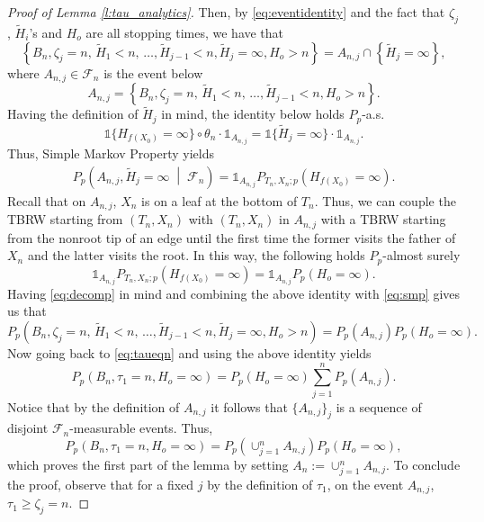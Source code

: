 \documentclass[a4paper]{amsart}
\newcommand{\hitfetak}{\widetilde{H}}
\newcommand{\Lbrace}{\left\lbrace}
\newcommand{\Rbrace}{\right\rbrace}
\begin{document}
\begin{proof}[Proof of Lemma \ref{l:tau_analytics}]
Then, by \eqref{eq:eventidentity} and the fact that $\zeta_j$, $\hitfetak_i$'s and $H_o$ are all stopping times, we have that
\begin{equation}\label{eq:decomp}
    \Lbrace B_n, \zeta_j = n,\, \hitfetak_1 < n,\, \dots, \hitfetak_{j-1} < n, \hitfetak_j = \infty, H_o >n\Rbrace = A_{n,j}\cap \Lbrace \hitfetak_j = \infty \Rbrace,
\end{equation}
where $A_{n,j} \in \mathcal{F}_n$ is the event below
\begin{equation}\label{eq:Anj}
A_{n,j} = \Lbrace B_n,\zeta_j = n,\, \hitfetak_1 < n,\, \dots, \hitfetak_{j-1} < n, H_o >n\Rbrace.
\end{equation}
Having the definition of $\hitfetak_j$ in mind, the identity below holds $P_p$-a.s.
\begin{equation}
      \mathds{1}\{H_{f(X_0)} = \infty \} \circ \theta_n \cdot \mathds{1}_{A_{n,j}} = \mathds{1}\{\hitfetak_j = \infty \} \cdot \mathds{1}_{A_{n,j}}.
\end{equation}
Thus, Simple Markov Property yields
\begin{equation}\label{eq:smp}
    \begin{split}
        P_p\left( A_{n,j}, \hitfetak_j = \infty \; \middle | \; \mathcal{F}_n\right) = \mathds{1}_{A_{n,j}} P_{T_n,X_n;p}\left( H_{f(X_0)} = \infty \right).
    \end{split}
\end{equation}
Recall that on $A_{n,j}$, $X_n$ is on a leaf at the bottom of $T_n$. Thus, we can couple the TBRW starting from $(T_n,X_n)$ with $(T_n,X_n)$ in $A_{n,j}$ with a TBRW starting from the nonroot tip of an edge until the first time the former visits the father of $X_n$ and the latter visits the root. In this way, the following holds $P_p$-almost surely
\begin{equation}
    \mathds{1}_{A_{n,j}} P_{T_n,X_n;p}\left( H_{f(X_0)} = \infty \right) = \mathds{1}_{A_{n,j}}P_p(H_o = \infty).
\end{equation}
Having \eqref{eq:decomp} in mind and combining the above identity with \eqref{eq:smp} gives us that
\begin{equation}
    P_p\left( B_n,\zeta_j = n,\, \hitfetak_1 < n,\, \dots, \hitfetak_{j-1} < n, \hitfetak_j = \infty, H_o >n\right) = P_p(A_{n,j})P_p(H_o = \infty).
\end{equation}
Now going back to \eqref{eq:taueqn} and using the above identity yields
\begin{equation}
    P_p(B_n,\tau_1 = n, H_o = \infty) = P_p(H_o = \infty)\sum_{j=1}^n P_p(A_{n,j}).
\end{equation}
Notice that by the definition of $A_{n,j}$ it follows that $\{A_{n,j}\}_j$ is a sequence of disjoint $\mathcal{F}_n$-measurable events. Thus, 
\begin{equation}
    P_p(B_n,\tau_1 = n, H_o = \infty) = P_p \left(\cup_{j=1}^nA_{n,j} \right)P_p(H_o = \infty),
\end{equation}
which proves the first part of the lemma by setting $A_n := \cup_{j=1}^nA_{n,j}$. To conclude the proof, observe that for a fixed $j$ by the definition of $\tau_1$, on the event $A_{n,j}$, $\tau_1 \ge \zeta_j = n$.



\end{proof}
\end{document}
